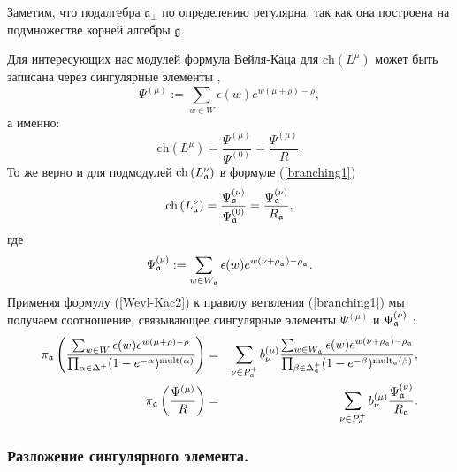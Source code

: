 Заметим, что подалгебра  $\mathfrak{a}_{\bot}$ по определению регулярна, так как она построена на подмножестве корней алгебры $\mathfrak{g}$.

Для интересующих нас модулей формула Вейля-Каца для  $\mathrm{ch}\left( L^{\mu }\right) $ может быть записана через сингулярные элементы \cite{humphreys1997introduction},
\begin{equation*}
\Psi ^{\left( \mu \right) }:=\sum\limits_{w\in W}\epsilon (w)e^{w(\mu +\rho
)-\rho },
\end{equation*}
а именно:
\begin{equation}
\mathrm{ch}\left( L^{\mu }\right) =\frac{\Psi ^{\left( \mu \right) }}{\Psi
^{\left( 0\right) }}=\frac{\Psi ^{\left( \mu \right) }}{R}.
\label{Weyl-Kac2}
\end{equation}
То же верно и для подмодулей $\mathrm{ch}\left( L_{\frak{a}}^{\nu
}\right) $ в формуле (\ref{branching1})
\begin{equation*}
\mathrm{ch}\left( L_{\frak{a}}^{\nu }\right) =\frac{\Psi _{\frak{a}}^{\left(
\nu \right) }}{\Psi _{\frak{a}}^{\left( 0\right) }}=\frac{\Psi _{\frak{a}%
}^{\left( \nu \right) }}{R_{\frak{a}}},
\end{equation*}
где
\begin{equation*}
\Psi _{\frak{a}}^{\left( \nu \right) }:=\sum\limits_{w\in W_{\frak{a}%
}}\epsilon (w)e^{w(\nu +\rho _{_{\frak{a}}})-\rho _{_{\frak{a}}}}.
\end{equation*}
Применяя формулу  (\ref{Weyl-Kac2}) к правилу ветвления  (\ref{branching1}) мы получаем соотношение, связывающее сингулярные элементы $\Psi ^{\left( \mu
\right) }$ и $\Psi _{\frak{a}}^{\left( \nu \right) }$ :
\begin{eqnarray}
\pi _{\frak{a}}\left( \frac{\sum_{w \in W}\epsilon (w )e^{w (\mu +\rho
)-\rho }}{\prod_{\alpha \in \Delta ^{+}}(1-e^{-\alpha })^{\mathrm{mult}%
(\alpha )}}\right) &=&\sum_{\nu \in P_{\frak{a}}^{+}}b_{\nu }^{(\mu )}\frac{%
\sum_{w \in W_{\frak{a}}}\epsilon (w )e^{w (\nu +\rho _{\frak{a}})-\rho _{%
\frak{a}}}}{\prod_{\beta \in \Delta _{\frak{a}}^{+}}(1-e^{-\beta })^{\mathrm{%
mult}_{\frak{a}}(\beta )}},  \notag  \label{eq:4} \\
\pi _{\frak{a}}\left( \frac{\Psi ^{\left( \mu \right) }}{R}\right)
&=&\sum_{\nu \in P_{\frak{a}}^{+}}b_{\nu }^{(\mu )}\frac{\Psi _{\frak{a}%
}^{\left( \nu \right) }}{R_{\frak{a}}}.
\end{eqnarray}

\subsubsection{Разложение сингулярного элемента.}


